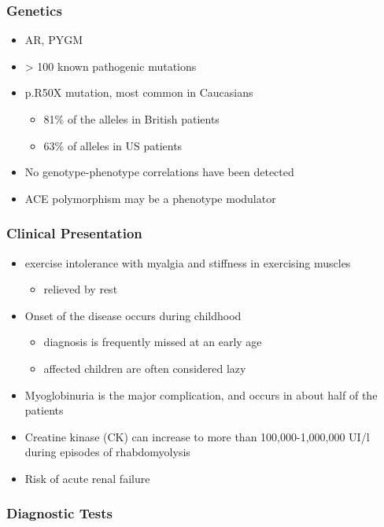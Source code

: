 \documentclass{scrartcl}
\begin{document}
\subsubsection{Genetics}
\label{sec:org933337b}
\begin{itemize}
\item AR, PYGM
\item \textgreater{} 100 known pathogenic mutations
\item p.R50X mutation, most common in Caucasians
\begin{itemize}
\item 81\% of the alleles in British patients
\item 63\% of alleles in US patients
\end{itemize}
\item No genotype-phenotype correlations have been detected
\item ACE polymorphism may be a phenotype modulator
\end{itemize}

\subsubsection{Clinical Presentation}
\label{sec:orgcf0423d}
\begin{itemize}
\item exercise intolerance with myalgia and stiffness in exercising muscles
\begin{itemize}
\item relieved by rest
\end{itemize}
\item Onset of the disease occurs during childhood
\begin{itemize}
\item diagnosis is frequently missed at an early age
\item affected children are often considered lazy
\end{itemize}
\item Myoglobinuria is the major complication, and occurs in about half of
the patients
\item Creatine kinase (CK) can increase to more than 100,000-1,000,000
UI/l during episodes of rhabdomyolysis
\item Risk of acute renal failure
\end{itemize}

\subsubsection{Diagnostic Tests}
\label{sec:org2b5c453}
\end{document}
